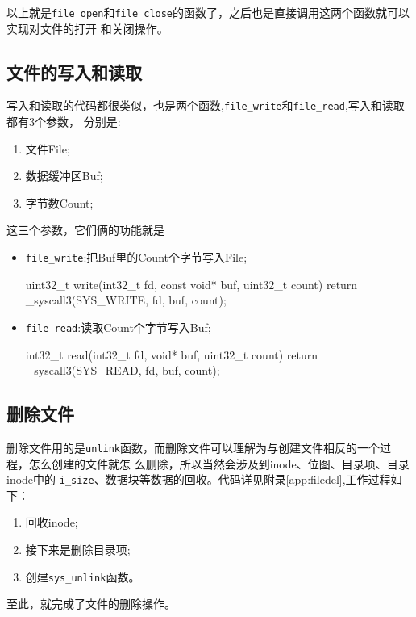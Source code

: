 以上就是\texttt{file\_open}和\texttt{file\_close}的函数了，之后也是直接调用这两个函数就可以实现对文件的打开
和关闭操作。

\subsection{文件的写入和读取}
写入和读取的代码都很类似，也是两个函数,\texttt{file\_write}和\texttt{file\_read},写入和读取都有3个参数，
分别是:
\begin{enumerate}
\item 文件File;
\item 数据缓冲区Buf;
\item 字节数Count;
\end{enumerate}
这三个参数，它们俩的功能就是
\begin{itemize}
\item \texttt{file\_write}:把Buf里的Count个字节写入File;
\begin{ccode}
uint32_t write(int32_t fd, const void* buf, uint32_t count)
{
   return _syscall3(SYS_WRITE, fd, buf, count);
}
\end{ccode}
\item \texttt{file\_read}:读取Count个字节写入Buf;
\begin{ccode}
int32_t read(int32_t fd, void* buf, uint32_t count)
{
   return _syscall3(SYS_READ, fd, buf, count);
}
\end{ccode}
\end{itemize}

\subsection{删除文件}

删除文件用的是\texttt{unlink}函数，而删除文件可以理解为与创建文件相反的一个过程，怎么创建的文件就怎
么删除，所以当然会涉及到inode、位图、目录项、目录inode中的
\texttt{i\_size}、数据块等数据的回收。代码详见附录\ref{app:filedel},工作过程如下：
\begin{enumerate}
\item 回收inode;
\item 接下来是删除目录项;
\item 创建\texttt{sys\_unlink}函数。
\end{enumerate}
至此，就完成了文件的删除操作。

